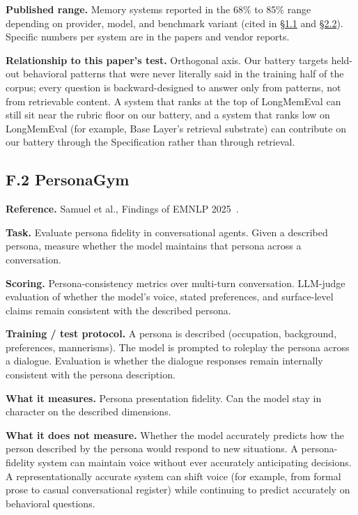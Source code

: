 \textbf{Published range.} Memory systems reported in the 68\% to 85\%
range depending on provider, model, and benchmark variant (cited in \hyperref[recall-is-not-interpretation.-interpretation-can-be-measured.]{§1.1}
and \hyperref[memory-systems-for-llm-agents]{§2.2}). Specific numbers per system are in the papers and vendor
reports.

\textbf{Relationship to this paper's test.} Orthogonal axis. Our battery
targets held-out behavioral patterns that were never literally said in
the training half of the corpus; every question is backward-designed to
answer only from patterns, not from retrievable content. A system that
ranks at the top of LongMemEval can still sit near the rubric floor on
our battery, and a system that ranks low on LongMemEval (for example,
Base Layer's retrieval substrate) can contribute on our battery through
the Specification rather than through retrieval.

\hypertarget{f.2-personagym}{%
\subsection{F.2 PersonaGym}\label{f.2-personagym}}

\textbf{Reference.} Samuel et al., Findings of EMNLP 2025~\citep{samuel2025personagym}.

\textbf{Task.} Evaluate persona fidelity in conversational agents. Given
a described persona, measure whether the model maintains that persona
across a conversation.

\textbf{Scoring.} Persona-consistency metrics over multi-turn
conversation. LLM-judge evaluation of whether the model's voice, stated
preferences, and surface-level claims remain consistent with the
described persona.

\textbf{Training / test protocol.} A persona is described (occupation,
background, preferences, mannerisms). The model is prompted to roleplay
the persona across a dialogue. Evaluation is whether the dialogue
responses remain internally consistent with the persona description.

\textbf{What it measures.} Persona presentation fidelity. Can the model
stay in character on the described dimensions.

\textbf{What it does not measure.} Whether the model accurately predicts
how the person described by the persona would respond to new situations.
A persona-fidelity system can maintain voice without ever accurately
anticipating decisions. A representationally accurate system can shift
voice (for example, from formal prose to casual conversational register)
while continuing to predict accurately on behavioral questions.

